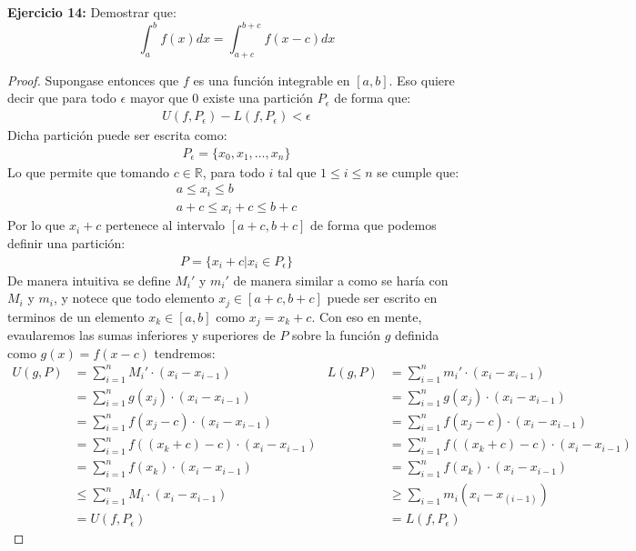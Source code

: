 \documentclass[../../main.tex]{subfiles}
\begin{document}
\question \textbf{Ejercicio 14:} Demostrar que:
$$\int_a^b f(x) dx = \int_{a+c}^{b+c} f(x-c) dx$$
\begin{proof}
    Supongase entonces que $f$ es una función integrable en $[a, b]$. Eso quiere decir que para todo $\epsilon$ mayor que $0$
    existe una partición $P_\epsilon$ de forma que:
    \begin{align*}
        U(f, P_\epsilon) - L(f, P_\epsilon) < \epsilon
    \end{align*}
    Dicha partición puede ser escrita como:
    \begin{align*}
        P_\epsilon = \{x_0, x_1, \dots, x_n\}
    \end{align*}
    Lo que permite que tomando $c \in \mathbb{R}$, para todo $i$ tal que $1\le i \le n$ se cumple que:
    \begin{align*}
        a \le x_i \le b\\
        a+c \le x_i+c \le b+c
    \end{align*}
    Por lo que $x_i+c$ pertenece al intervalo $[a+c, b+c]$ de forma que podemos definir una partición:
    \begin{align*}
        P = \{x_i + c | x_i \in P_\epsilon\}
    \end{align*}
    De manera intuitiva se define $M_i'$ y $m_i'$ de manera similar a como se haría con $M_i$ y $m_i$, y notece que todo elemento $x_j \in [a+c, b+c]$ puede ser escrito en terminos de un elemento $x_k \in [a, b]$ como $x_j = x_k + c$.
    Con eso en mente, evaularemos las sumas inferiores y superiores de $P$ sobre la función $g$ definida como $g(x) = f(x-c)$ tendremos:
    \begin{align*}
        U(g, P) &= \sum_{i =1}^n M_i' \cdot (x_i - x_{i-1}) & L(g, P) &= \sum_{i =1}^n m_i' \cdot (x_i - x_{i-1})\\
        &= \sum_{i =1}^n g(x_j) \cdot (x_i - x_{i-1}) & &= \sum_{i =1}^n g(x_j) \cdot (x_i - x_{i-1})\\
        &= \sum_{i =1}^n f(x_j-c) \cdot (x_i - x_{i-1}) & &= \sum_{i =1}^n f(x_j-c) \cdot (x_i - x_{i-1})\\
        &= \sum_{i =1}^n f((x_k +c)-c) \cdot (x_i - x_{i-1}) & &= \sum_{i =1}^n f((x_k+c)-c) \cdot (x_i - x_{i-1})\\
        &= \sum_{i =1}^n f(x_k) \cdot (x_i - x_{i-1}) & &= \sum_{i =1}^n f(x_k) \cdot (x_i - x_{i-1})\\
        &\le \sum_{i =1}^n M_i \cdot (x_i - x_{i-1}) & &\ge \sum_{i = 1}m_i (x_i-x_(i-1))\\
        &= U(f, P_\epsilon) & &= L(f, P_\epsilon)

\end{align*}
\end{proof}
\end{document}
